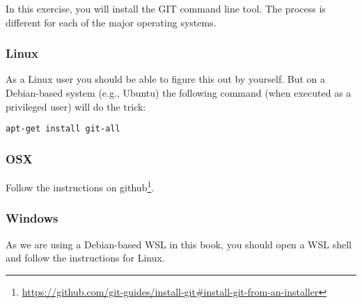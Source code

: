 In this exercise, you will install the GIT command line tool. The process is different for each of the major operating systems.

\subsubsection{Linux}

As a Linux user you should be able to figure this out by yourself. But on a Debian-based system (e.g., Ubuntu) the following command (when executed as a privileged user) will do the trick:

\begin{verbatim}
apt-get install git-all
\end{verbatim}

\subsubsection{OSX}

Follow the instructions on github\footnote{\url{https://github.com/git-guides/install-git\#install-git-from-an-installer}}.

\subsubsection{Windows}

As we are using a Debian-based WSL in this book, you should open a WSL shell and follow the instructions for Linux.

